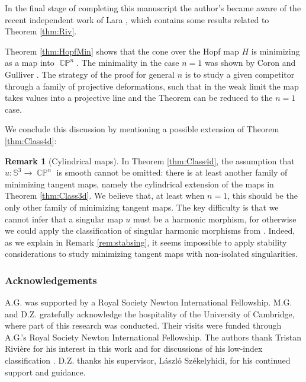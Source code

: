 \documentclass[11pt]{article}
\theoremstyle{plain}
\numberwithin{equation}{section}
\theoremstyle{definition}
\newtheorem{remark}[theorem]{Remark}
\def \mb{\mathbb}
\DeclareMathOperator{\CP}{\mathbb{CP}}
\begin{document}
In the final stage of completing this manuscript the author's became aware of the recent independent work of Lara \cite{Lara2026}, which contains some results related to Theorem \ref{thm:Riv}.

Theorem \ref{thm:HopfMin} shows that the cone over the Hopf map $H$ is minimizing as a map into $\CP^n$. The minimality in the case $n=1$ was shown by Coron and Gulliver \cite{Coron1989}. The strategy of the proof for general $n$ is to study a given competitor through a family of projective deformations, such that in the weak limit the map takes values into a projective line and the Theorem can be reduced to the $n=1$ case.
 
We conclude this discussion by mentioning a possible extension of Theorem \ref{thm:Class4d}:

\begin{remark}[Cylindrical maps]\label{rmk:cylinders}
    In Theorem \ref{thm:Class4d}, the assumption that $u\colon \mb S^3\to \CP^n$ is smooth cannot be omitted: there is at least another family of minimizing tangent maps, namely the cylindrical extension of the maps in Theorem \ref{thm:Class3d}. We believe that, at least when $n=1$, this should be the only other family of minimizing tangent maps. The key difficulty is that we cannot infer that a singular map $u$ must be a harmonic morphism, for otherwise we could apply the classification of singular harmonic morphisms from \cite{Baird1991}. Indeed, as we explain in Remark \ref{rem:stabsing}, it seems impossible to apply stability considerations to study minimizing tangent maps with non-isolated singularities.
\end{remark}

\subsubsection*{Acknowledgements}

A.G. was supported by a Royal Society Newton International Fellowship. M.G. and D.Z. gratefully acknowledge the hospitality of the University of Cambridge, where part of this research was conducted. Their visits were funded through A.G.’s Royal Society Newton International Fellowship. The authors thank Tristan Rivi\`ere for his interest in this work and for discussions of his low-index classification \cite{Riv23}. D.Z. thanks his supervisor, László Székelyhidi, for his continued support and guidance.
\end{document}
